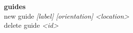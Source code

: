 \documentclass[a4paper,10pt,oneside]{article}
\begin{document}
\begin{tcolorbox}[width=7.5cm]
  \begin{minipage}{7.5cm}
    \begin{flushleft}
    \textbf{guides} \\
    new guide \textit{[label]} \textit{[orientation]} \textit{<location>} \\
    delete guide \textit{<id>}\\
    \end{flushleft}
  \end{minipage}
\end{tcolorbox}
\end{document}
